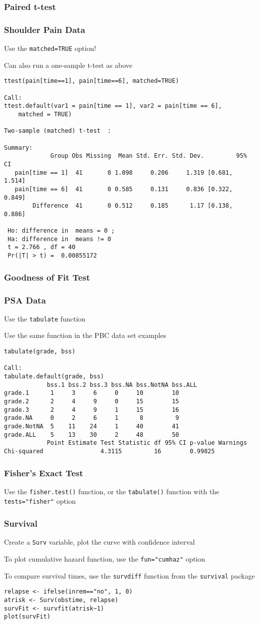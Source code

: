 \documentclass[pdf]{beamer}
\begin{document}
\begin{frame}[fragile]
\frametitle{Paired t-test}
\frametitle{Shoulder Pain Data}
Use the \texttt{matched=TRUE} option!

Can also run a one-sample t-test as above
{\fontsize{7pt}{7.2}\selectfont
\begin{verbatim}
ttest(pain[time==1], pain[time==6], matched=TRUE)

Call:
ttest.default(var1 = pain[time == 1], var2 = pain[time == 6], 
    matched = TRUE)

Two-sample (matched) t-test  :
 
Summary:
             Group Obs Missing  Mean Std. Err. Std. Dev.         95% CI
   pain[time == 1]  41       0 1.098     0.206     1.319 [0.681, 1.514]
   pain[time == 6]  41       0 0.585     0.131     0.836 [0.322, 0.849]
        Difference  41       0 0.512     0.185      1.17 [0.138, 0.886]

 Ho: difference in  means = 0 ; 
 Ha: difference in  means != 0 
 t = 2.766 , df = 40 
 Pr(|T| > t) =  0.00855172 
\end{verbatim}}
\end{frame}

\begin{frame}[fragile]
\frametitle{Goodness of Fit Test}
\frametitle{PSA Data}
Use the \texttt{tabulate} function

Use the same function in the PBC data set examples

{\fontsize{7pt}{7.2}\selectfont
\begin{verbatim}
tabulate(grade, bss)

Call:
tabulate.default(grade, bss)
            bss.1 bss.2 bss.3 bss.NA bss.NotNA bss.ALL
grade.1      1     3     6     0     10        10     
grade.2      2     4     9     0     15        15     
grade.3      2     4     9     1     15        16     
grade.NA     0     2     6     1      8         9     
grade.NotNA  5    11    24     1     40        41     
grade.ALL    5    13    30     2     48        50     
            Point Estimate Test Statistic df 95% CI p-value Warnings
Chi-squared                4.3115         16        0.99825    
\end{verbatim}}
\end{frame}

\begin{frame}[fragile]
\frametitle{Fisher's Exact Test}
Use the \texttt{fisher.test()} function, or the \texttt{tabulate()} function with the \texttt{tests="fisher"} option
\end{frame}

\begin{frame}[fragile]
\frametitle{Survival}
Create a \texttt{Surv} variable, plot the curve with confidence interval

To plot cumulative hazard function, use the \texttt{fun="cumhaz"} option

To compare survival times, use the \texttt{survdiff} function from the \texttt{survival} package
\begin{verbatim}
relapse <- ifelse(inrem=="no", 1, 0)
atrisk <- Surv(obstime, relapse)
survFit <- survfit(atrisk~1)
plot(survFit)
\end{verbatim}
\end{frame}
\end{document}
